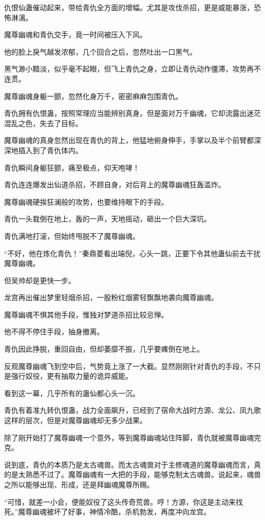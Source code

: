 \begin{this_body}
仇恨仙蛊催动起来，带给青仇全方面的增幅。尤其是攻伐杀招，更是威能暴涨，恐怖淋漓。

魔尊幽魂和青仇交手，竟一时间被压入下风。

他的脸上戾气越发浓郁，几个回合之后，忽然吐出一口黑气。

黑气渺小黯淡，似乎毫不起眼，但飞上青仇之身，立即让青仇动作僵滞，攻势再不连贯。

魔尊幽魂身躯一颤，忽然化身万千，密密麻麻包围青仇。

青仇拥有仇恨蛊，按照常理应当能辨别真身。但是面对万千幽魂，它却流露出迷茫混乱之色，失去了目标。

魔尊幽魂的真身忽然出现在青仇的背上，他猛地俯身伸手，手掌以及半个前臂都深深地插入到了青仇体内。

青仇瞬间身躯狂颤，痛至极点，仰天咆哮！

青仇连连爆发出仙道杀招，不顾自身，对后背上的魔尊幽魂狂轰滥炸。

魔尊幽魂硬挨狂澜般的攻势，也要维持眼下的手段。

青仇一头栽倒在地上，轰的一声，天地摇动，砸出一个巨大深坑。

青仇满地打滚，但始终甩脱不了魔尊幽魂。

“不好，他在炼化青仇！”秦鼎菱看出端倪，心头一跳，正要下令其他蛊仙前去干扰魔尊幽魂。

但吴帅却是更快一步。

龙宫再出催出梦里轻烟杀招，一股粉红烟雾轻飘飘地袭向魔尊幽魂。

魔尊幽魂不惧其他手段，惟独对梦道杀招比较忌惮。

他不得不停住手段，抽身撤离。

青仇因此挣脱，重回自由，但却萎靡不振，几乎要瘫倒在地上。

反观魔尊幽魂飞到空中后，气势竟上涨了一大截。显然刚刚针对青仇的手段，不只是强行奴役，更有抽取力量的诡异威能。

看到这一幕，几乎所有的蛊仙都心头一沉。

青仇有着准九转仇恨蛊，战力全面飙升，已经到了宿命大战时方源、龙公、凤九歌这样的层次，但是对魔尊幽魂却无多少战果。

除了刚开始打了魔尊幽魂一个意外，等到魔尊幽魂站住阵脚，青仇就被魔尊幽魂完克。

说到底，青仇的本质乃是太古魂兽。而太古魂兽对于主修魂道的魔尊幽魂而言，真的是太熟悉不过了。魔尊幽魂有一大把的手段，能够克制太古魂兽。说起来，魂兽之所以能够出现、形成，还是拜幽魂魔尊所赐。

“可惜，就差一小会，便能奴役了这头传奇荒兽。哼！方源，你这是主动来找死。”魔尊幽魂被坏了好事，神情冷酷，杀机勃发，再度冲向龙宫。


\end{this_body}
